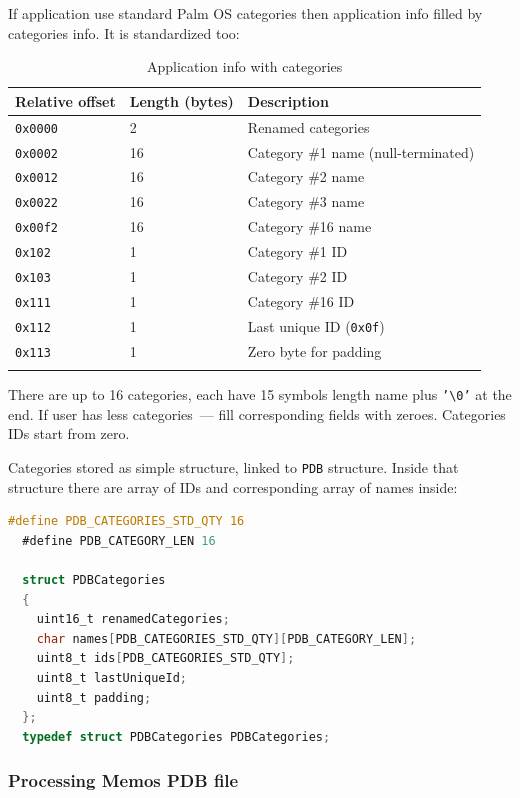 \documentclass[a4paper,12pt,oneside]{scrartcl}
\begin{document}
If application use standard Palm OS categories then application info filled by
categories info. It is standardized too:
\begin{longtable}{|p{2cm}|p{4cm}|p{7cm}|}
  \hline
  \textbf{Relative offset} & \textbf{Length (bytes)} & \textbf{Description} \\
  \hline
  \texttt{0x0000} & 2 & Renamed categories \\
  \hline
  \texttt{0x0002} & 16 & Category \#1 name (null-terminated) \\
  \hline
  \texttt{0x0012} & 16 & Category \#2 name \\
  \hline
  \texttt{0x0022} & 16 & Category \#3 name \\
  \hline
  \hline
  \texttt{0x00f2} & 16 & Category \#16 name \\
  \hline
  \texttt{0x102} & 1 & Category \#1 ID \\
  \hline
  \texttt{0x103} & 1 & Category \#2 ID \\
  \hline
  \hline
  \texttt{0x111} & 1 & Category \#16 ID \\
  \hline
  \texttt{0x112} & 1 & Last unique ID (\texttt{0x0f}) \\
  \hline
  \texttt{0x113} & 1 & Zero byte for padding \\
  \hline
  \caption{Application info with categories}
  \label{tab:application-info-categories}
\end{longtable}

There are up to 16 categories, each have 15 symbols length name plus
\texttt{'\textbackslash{}0'} at the end. If user has less categories~--- fill
corresponding fields with zeroes. Categories IDs start from zero.

Categories stored as simple structure, linked to \texttt{PDB} structure. Inside
that structure there are array of IDs and corresponding array of names inside:
\begin{lstlisting}[language=C, caption={C structure to store categories data}]
  #define PDB_CATEGORIES_STD_QTY 16
  #define PDB_CATEGORY_LEN 16

  struct PDBCategories
  {
	uint16_t renamedCategories;
	char names[PDB_CATEGORIES_STD_QTY][PDB_CATEGORY_LEN];
	uint8_t ids[PDB_CATEGORIES_STD_QTY];
	uint8_t lastUniqueId;
	uint8_t padding;
  };
  typedef struct PDBCategories PDBCategories;
\end{lstlisting}

\subsubsection{Processing Memos PDB file}
\label{sec:processing-memos-pdb}
\end{document}
